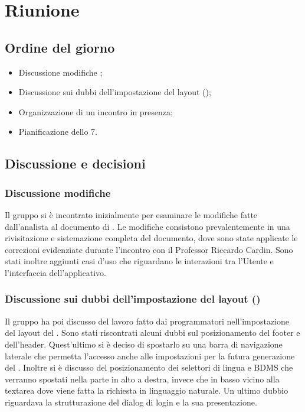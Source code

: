 \section{Riunione}
\subsection{Ordine del giorno}
\begin{itemize}
	\item Discussione modifiche \AdR;
	\item Discussione sui dubbi dell'impostazione del layout ();
	\item Organizzazione di un incontro in presenza;
	\item Pianificazione dello  7.
\end{itemize}

\subsection{Discussione e decisioni}
\subsubsection{Discussione modifiche \AdR}
\par Il gruppo si è incontrato inizialmente per esaminare le modifiche fatte dall'analista al documento di \AdR. Le modifiche consistono prevalentemente in una rivisitazione e sistemazione completa del documento, dove sono state applicate le correzioni evidenziate durante l'incontro con il Professor Riccardo Cardin. Sono stati inoltre aggiunti casi d'uso che riguardano le interazioni tra l'Utente e l'interfaccia dell'applicativo.

\subsubsection{Discussione sui dubbi dell'impostazione del layout ()}
\par Il gruppo ha poi discusso del lavoro fatto dai programmatori nell'impostazione del layout del . Sono stati riscontrati alcuni dubbi sul posizionamento del footer e dell'header. Quest'ultimo si è deciso di spostarlo su una barra di navigazione laterale che permetta l'accesso anche alle impostazioni per la futura generazione del . Inoltre si è discusso del posizionamento dei selettori di lingua e BDMS che verranno spostati nella parte in alto a destra, invece che in basso vicino alla textarea dove viene fatta la richiesta in linguaggio naturale. Un ultimo dubbio riguardava la strutturazione del dialog di login e la sua presentazione.

